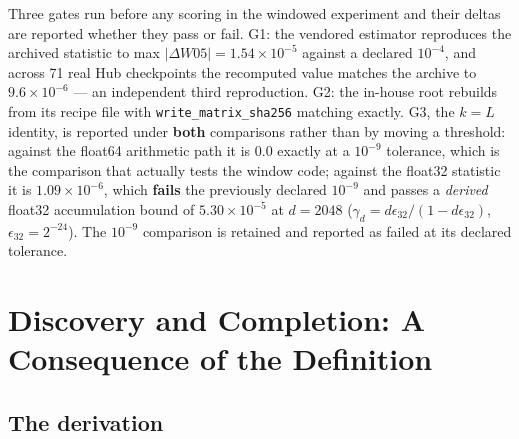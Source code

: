 \documentclass[11pt,letterpaper]{article}
\begin{document}
Three gates run before any scoring in the windowed experiment and their deltas are reported whether they pass or fail. G1: the vendored estimator reproduces the archived statistic to max $|\Delta W05| = 1.54\times10^{-5}$ against a declared $10^{-4}$, and across 71 real Hub checkpoints the recomputed value matches the archive to $9.6\times10^{-6}$ --- an independent third reproduction. G2: the in-house root rebuilds from its recipe file with \texttt{write\_matrix\_sha256} matching exactly. G3, the $k = L$ identity, is reported under \textbf{both} comparisons rather than by moving a threshold: against the float64 arithmetic path it is $0.0$ exactly at a $10^{-9}$ tolerance, which is the comparison that actually tests the window code; against the float32 statistic it is $1.09\times10^{-6}$, which \textbf{fails} the previously declared $10^{-9}$ and passes a \emph{derived} float32 accumulation bound of $5.30\times10^{-5}$ at $d = 2048$ ($\gamma_d = d\epsilon_{32}/(1-d\epsilon_{32})$, $\epsilon_{32}=2^{-24}$). The $10^{-9}$ comparison is retained and reported as failed at its declared tolerance.

\section{Discovery and Completion: A Consequence of the Definition}
\label{sec:theory}

\subsection{The derivation}
\end{document}
